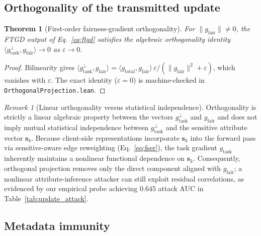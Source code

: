 \documentclass[preprint,12pt]{elsarticle}
\theoremstyle{plain}
\newtheorem{theorem}{Theorem}
\theoremstyle{definition}
\theoremstyle{remark}
\newtheorem{remark}{Remark}
\begin{document}
\subsection{Orthogonality of the transmitted update}

\begin{theorem}[First-order fairness-gradient orthogonality]\label{thm:non_leakage}
For $\lVert g_{\mathrm{fair}}\rVert \neq 0$, the FTGD output of Eq.~\eqref{eq:ftgd} satisfies the algebraic orthogonality identity $\langle g^{\perp}_{\mathrm{task}}, g_{\mathrm{fair}}\rangle \to 0$ as $\varepsilon \to 0$.
\end{theorem}

\begin{proof}
Bilinearity gives $\langle g^{\perp}_{\mathrm{task}}, g_{\mathrm{fair}}\rangle = \langle g_{\mathrm{total}},g_{\mathrm{fair}}\rangle\,\varepsilon/(\lVert g_{\mathrm{fair}}\rVert^2+\varepsilon)$, which vanishes with $\varepsilon$. The exact identity ($\varepsilon = 0$) is machine-checked in \texttt{Orthogonal\allowbreak Projection.lean}.
\end{proof}

\begin{remark}[Linear orthogonality versus statistical independence]
\label{rem:non_leakage_scope}
Orthogonality is strictly a linear algebraic property between the vectors $g^\perp_{\mathrm{task}}$ and $g_{\mathrm{fair}}$ and does not imply mutual statistical independence between $g^\perp_{\mathrm{task}}$ and the sensitive attribute vector $\bm{s}_k$. Because client-side representations incorporate $\bm{s}_k$ into the forward pass via sensitive-aware edge reweighting (Eq.~\ref{eq:fser}), the task gradient $g_{\mathrm{task}}$ inherently maintains a nonlinear functional dependence on $\bm{s}_k$. Consequently, orthogonal projection removes only the direct component aligned with $g_{\mathrm{fair}}$; a nonlinear attribute-inference attacker can still exploit residual correlations, as evidenced by our empirical probe achieving $0.645$ attack AUC in Table~\ref{tab:update_attack}.
\end{remark}

\subsection{Metadata immunity}
\end{document}
